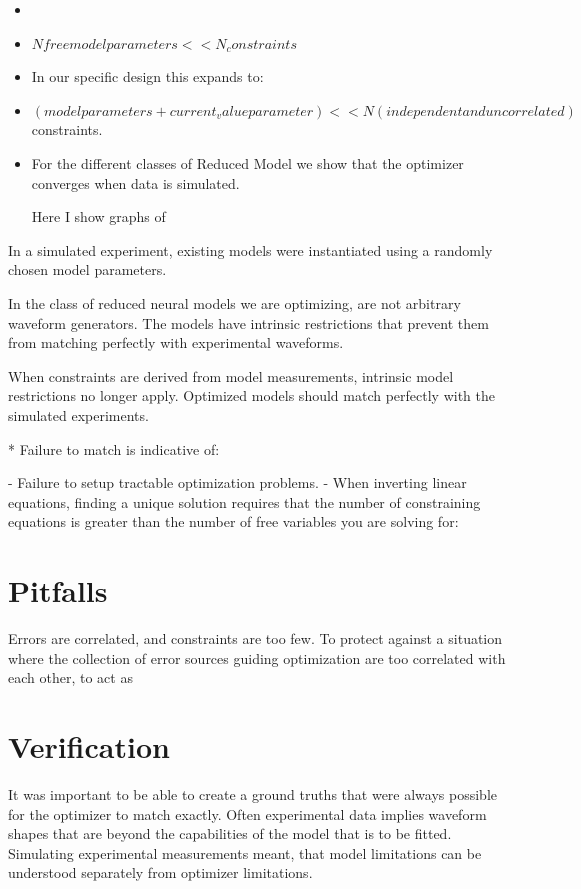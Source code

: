 
\begin{itemize}
    \item 
\item  $N free model parameters << N_constraints$
\item  In our specific design this expands to:
\item  $(model parameters + current_value parameter) << N (independent and uncorrelated)$ constraints.
\item  For the different classes of Reduced Model we show that the optimizer converges when data is simulated.


Here I show graphs of
\end{itemize}



In a simulated experiment, existing models were instantiated using a randomly chosen model parameters.

In the class of reduced neural models we are optimizing, are not arbitrary waveform generators. The models have intrinsic restrictions that prevent them from matching perfectly with experimental waveforms.

When constraints are derived from model measurements, intrinsic model restrictions no longer apply. Optimized models should match perfectly with the simulated experiments. 

* Failure to match is indicative of:

- Failure to setup tractable optimization problems.
- When inverting linear equations, finding a unique solution requires that the number of constraining equations is greater than the number of free variables you are solving for:

\section{Pitfalls}
Errors are correlated, and constraints are too few.
To protect against a situation where the collection of error sources guiding optimization are too correlated with each other, to act as 


\section{Verification}
It was important to be able to create a ground truths that were always possible for the optimizer to match exactly. Often experimental data implies waveform shapes that are beyond the capabilities of the model that is to be fitted. Simulating experimental measurements meant, that model limitations can be understood separately from optimizer limitations.

